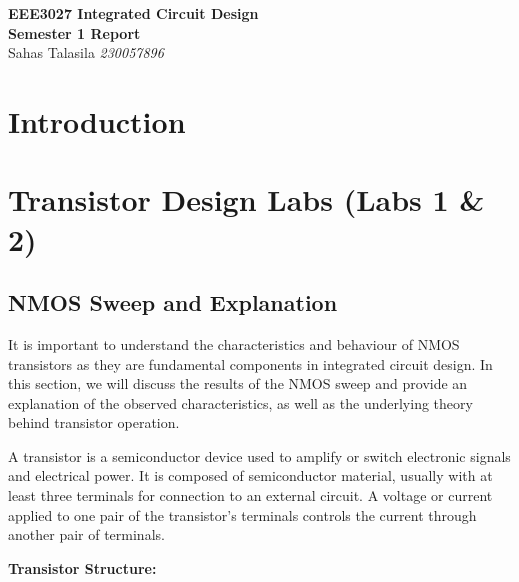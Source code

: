 \documentclass[a4paper,12pt]{article}
\begin{document}
\begin{titlepage}
    \centering
    \vspace*{2cm}
    \Huge{\textbf{EEE3027 Integrated Circuit Design}}\\[0.5cm]
    \Large{\textbf{Semester 1 Report}}\\ 
    \Large{Sahas Talasila \textit{230057896}}
    \vfill
\end{titlepage}

\tableofcontents
\newpage

\begin{abstract}
    This is a placeholder for the abstract of the report.
\end{abstract}

\newpage

\section{Introduction}

\section{Transistor Design Labs \- (Labs 1 \& 2)}

\subsection{NMOS Sweep and Explanation}

It is important to understand the characteristics and behaviour of NMOS transistors as they are fundamental components in integrated circuit design. 
In this section, we will discuss the results of the NMOS sweep and provide an explanation of the observed characteristics, as well as the underlying theory behind transistor operation.

A transistor is a semiconductor device used to amplify or switch electronic signals and electrical power. 
It is composed of semiconductor material, usually with at least three terminals for connection to an external circuit. A voltage or current applied to one pair of the transistor's terminals controls the current through another pair of terminals.

\textbf{Transistor Structure:}
\end{document}
